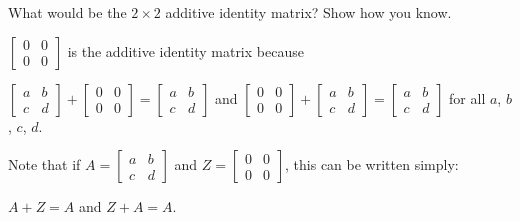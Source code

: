 \documentclass[space,handout,nooutcomes]{ximera}
\begin{document}
\begin{question}
What would be the $2\times 2$ additive identity matrix?  Show how you
know.
\begin{freeResponse}
\begin{hint}
$\begin{bmatrix} 0&0 \\ 0&0 \end{bmatrix}$ is the additive identity matrix because 

$\begin{bmatrix} a&b \\ c&d \end{bmatrix} + \begin{bmatrix} 0&0 \\ 0&0 \end{bmatrix} = 
\begin{bmatrix} a&b \\ c&d \end{bmatrix}$  
and
$\begin{bmatrix} 0&0 \\ 0&0 \end{bmatrix} + \begin{bmatrix} a&b \\ c&d \end{bmatrix} = 
\begin{bmatrix} a&b \\ c&d \end{bmatrix}$  for all $a$, $b$, $c$, $d$.  

Note that if $A = \begin{bmatrix} a&b \\ c&d \end{bmatrix}$ and $Z = \begin{bmatrix} 0&0 \\ 0&0 \end{bmatrix}$, this can be written simply:  

$A + Z = A$ and $Z+A = A$.  
\end{hint}
\end{freeResponse}
\end{question}
\end{document}
